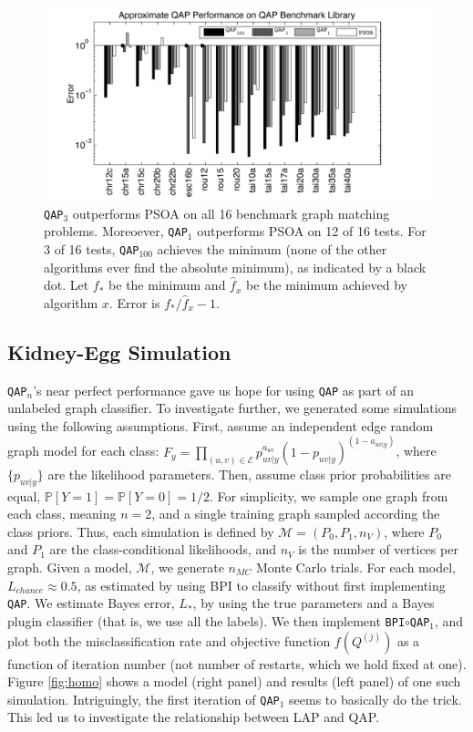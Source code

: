 \documentclass{article} %
\newcommand{\PP}{\mathbb{P}}           %
\providecommand{\mc}[1]{\mathcal{#1}}
\providecommand{\mh}[1]{\hat{#1}}
\newcommand{\qap}{\texttt{QAP} }
\newcommand{\qapa}{\texttt{QAP}$_1$ }
\newcommand{\qapb}{\texttt{QAP$_{100}$} }
\begin{document}
\begin{figure}[htbp]
	\centering			
	\includegraphics[width=1.0\linewidth]{../figs/benchmarks.pdf}
	\caption{\texttt{QAP}$_3$ outperforms PSOA on all 16 benchmark graph matching problems.  Moreoever, \qapa outperforms PSOA on 12 of 16 tests.  For 3 of 16 tests, \qapb achieves the minimum (none of the other algorithms ever find the absolute minimum), as indicated by a black dot.  Let $f_*$ be the minimum and $\mh{f}_x$ be the minimum achieved by algorithm $x$.  Error is $f_*/\mh{f}_x-1$.  }
	\label{fig:fwpath}
\end{figure}




\subsection{Kidney-Egg Simulation}

\texttt{QAP}$_n$'s near perfect performance gave us hope for using \qap as part of an unlabeled graph classifier.  To investigate further, we generated some simulations using the following assumptions.  First, assume an independent edge random graph model for each class: $F_y=\prod_{(u,v) \in \mc{E}}p_{uv|y}^{a_{uv}} (1-p_{uv|y})^{(1-a_{uv|y})}$, where $\{p_{uv|y}\}$ are the likelihood parameters.  Then, assume class prior probabilities are equal, $\PP[Y=1]=\PP[Y=0]=1/2$.  For simplicity, we sample one graph from each class, meaning $n=2$, and a single training graph sampled according the class priors. Thus, each simulation is defined by $\mc{M}=(P_0,P_1,n_V)$, where $P_0$ and $P_1$ are the class-conditional likelihoods, and $n_V$ is the number of vertices per graph.  Given a model, $\mc{M}$, we generate $n_{MC}$ Monte Carlo trials.  For each model, $L_{chance}\approx 0.5$, as estimated by using BPI to classify without first implementing \texttt{QAP}.  We estimate Bayes error, $L_*$, by using the true parameters and a Bayes plugin classifier (that is, we use all the labels).  We then implement \texttt{BPI}$\circ$\texttt{QAP}$_1$, and plot both the misclassification rate and objective function $f(Q^{(j)})$ as a function of iteration number (not number of restarts, which we hold fixed at one). Figure \ref{fig:homo} shows a model (right panel) and results (left panel) of one such simulation. Intriguingly, the first iteration of \qapa seems to basically do the trick.  This led us to investigate the relationship between LAP and QAP.
\end{document}
